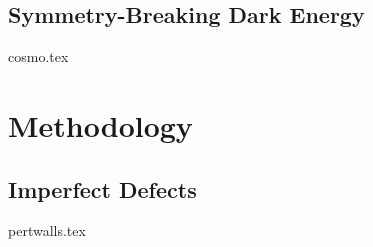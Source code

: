 \documentclass[UKenglish]{texmex/uiomasterthesis}
\begin{document}
\chapter{Symmetry-Breaking Dark Energy}\label{chap:cosmo}
    {{cosmo.tex}}













\part{Methodology}\label{part:method}




\chapter{Imperfect Defects}\label{chap:pertwalls}
    {{pertwalls.tex}}
\end{document}
